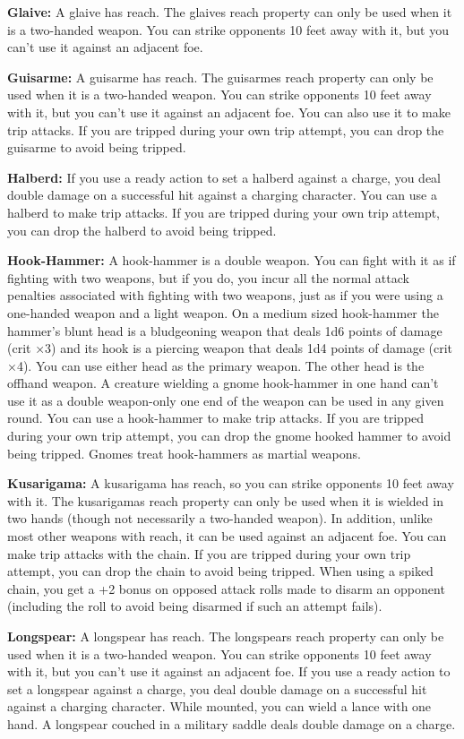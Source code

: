 \textbf{Glaive:} A glaive has reach. The glaives reach property can only be used when it is a two-handed weapon. You can strike opponents 10 feet away with it, but you can't use it against an adjacent foe.

\textbf{Guisarme:} A guisarme has reach. The guisarmes reach property can only be used when it is a two-handed weapon. You can strike opponents 10 feet away with it, but you can't use it against an adjacent foe. You can also use it to make trip attacks. If you are tripped during your own trip attempt, you can drop the guisarme to avoid being tripped.

\textbf{Halberd:} If you use a ready action to set a halberd against a charge, you deal double damage on a successful hit against a charging character. You can use a halberd to make trip attacks. If you are tripped during your own trip attempt, you can drop the halberd to avoid being tripped.

\textbf{Hook-Hammer:} A hook-hammer is a double weapon. You can fight with it as if fighting with two weapons, but if you do, you incur all the normal attack penalties associated with fighting with two weapons, just as if you were using a one-handed weapon and a light weapon. On a medium sized hook-hammer the hammer's blunt head is a bludgeoning weapon that deals 1d6 points of damage (crit ×3) and its hook is a piercing weapon that deals 1d4 points of damage (crit ×4). You can use either head as the primary weapon. The other head is the offhand weapon. A creature wielding a gnome hook-hammer in one hand can't use it as a double weapon-only one end of the weapon can be used in any given round. You can use a hook-hammer to make trip attacks. If you are tripped during your own trip attempt, you can drop the gnome hooked hammer to avoid being tripped. Gnomes treat hook-hammers as martial weapons.

\textbf{Kusarigama:} A kusarigama has reach, so you can strike opponents 10 feet away with it. The kusarigamas reach property can only be used when it is wielded in two hands (though not necessarily a two-handed weapon). In addition, unlike most other weapons with reach, it can be used against an adjacent foe. You can make trip attacks with the chain. If you are tripped during your own trip attempt, you can drop the chain to avoid being tripped. When using a spiked chain, you get a +2 bonus on opposed attack rolls made to disarm an opponent (including the roll to avoid being disarmed if such an attempt fails).

\textbf{Longspear:} A longspear has reach. The longspears reach property can only be used when it is a two-handed weapon. You can strike opponents 10 feet away with it, but you can't use it against an adjacent foe. If you use a ready action to set a longspear against a charge, you deal double damage on a successful hit against a charging character. While mounted, you can wield a lance with one hand. A longspear couched in a military saddle deals double damage on a charge.

